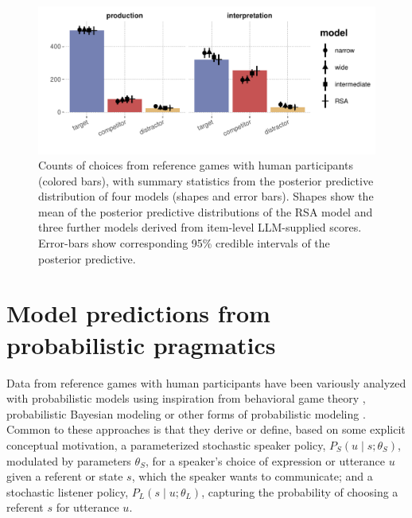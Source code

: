 \documentclass[fleqn]{article}
\begin{document}
\begin{figure}[t]
  \centering

    \includegraphics[width=0.9\linewidth]{00-pics/PPC-alpha-eps-model.pdf}

    \caption{Counts of choices from reference games with human participants (colored bars), with summary statistics from the posterior predictive distribution of four models (shapes and error bars).
      Shapes show the mean of the posterior predictive distributions of the RSA model and three further models derived from item-level LLM-supplied scores.
      Error-bars show corresponding 95\% credible intervals of the posterior predictive.
    }
  \label{fig:refgame-counts}
\end{figure}


\section{Model predictions from probabilistic pragmatics}
\label{sec:model-pred-from}

Data from reference games with human participants have been variously analyzed with probabilistic models using inspiration from behavioral game theory \citep[e.g.,][]{DegenFranke2013:Cost-Based-Prag}, probabilistic Bayesian modeling \citep[e.g.,][]{FrankGoodman2012:Predicting-Prag} or other forms of probabilistic modeling \citep[e.g.,][]{GattGompel2013:Are-we-Bayesian}.
Common to these approaches is that they derive or define, based on some explicit conceptual motivation, a parameterized stochastic speaker policy, $P_{S}(u \mid s; \theta_{S})$, modulated by parameters $\theta_{S}$, for a speaker's choice of expression or utterance $u$ given a referent or state $s$, which the speaker wants to communicate;
and a stochastic listener policy, $P_{L}(s \mid u; \theta_{L})$, capturing the probability of choosing a referent $s$ for utterance $u$.
\end{document}
